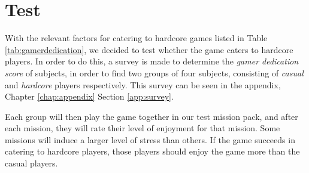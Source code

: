 \chapter{Test}
With the relevant factors for catering to hardcore games listed in Table \ref{tab:gamerdedication}, we decided to test whether the game caters to hardcore players.
In order to do this, a survey is made to determine the \emph{gamer dedication score} of subjects, in order to find two groups of four subjects, consisting of \emph{casual} and \emph{hardcore} players respectively.
This survey can be seen in the appendix, Chapter \ref{chap:appendix} Section \ref{app:survey}.

Each group will then play the game together in our test mission pack, and after each mission, they will rate their level of enjoyment for that mission.
Some missions will induce a larger level of stress than others.
If the game succeeds in catering to hardcore players, those players should enjoy the game more than the casual players.